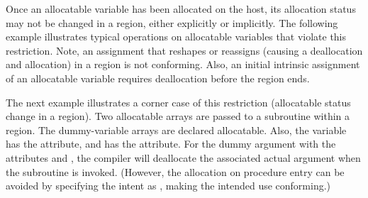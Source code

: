 
Once an allocatable variable has been allocated on the host,
its allocation status may not be changed in a  region, either
explicitly or implicitly. The following example illustrates typical
operations on allocatable variables that violate this restriction.
Note, an assignment that reshapes or reassigns (causing a deallocation
and allocation) in a  region is not conforming.
Also, an initial intrinsic assignment of an allocatable variable 
requires deallocation before the  region ends.


The next example illustrates a corner case of this restriction (allocatable status
change in a  region).
Two allocatable arrays are passed to a subroutine within a 
region. The dummy-variable arrays are declared allocatable.
Also, the  variable has the  attribute, and 
has the  attribute. 
For the dummy argument with the attributes  and , 
the compiler will deallocate the associated actual argument when the subroutine is invoked. 
(However, the allocation on procedure entry can be avoided by specifying the intent 
as , making the intended use conforming.)

